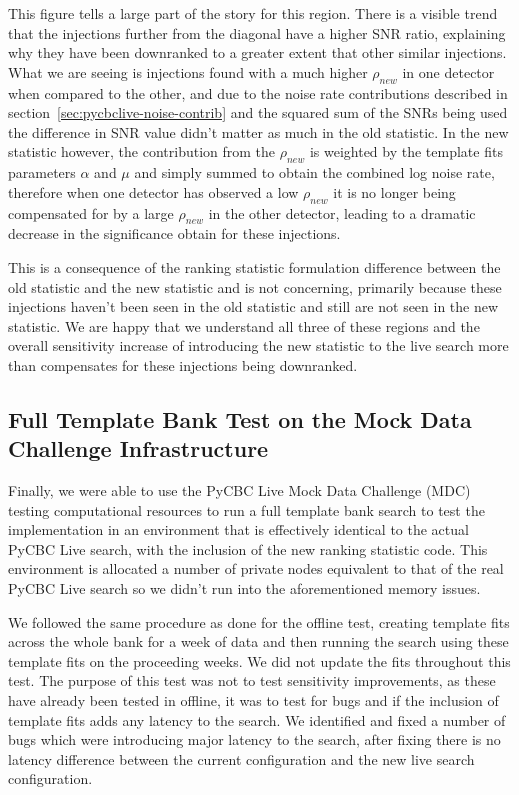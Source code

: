 %
This figure tells a large part of the story for this region. There is a visible trend that the injections further from the diagonal have a higher SNR ratio, explaining why they have been downranked to a greater extent that other similar injections. What we are seeing is injections found with a much higher $\rho_{new}$ in one detector when compared to the other, and due to the noise rate contributions described in section~\ref{sec:pycbclive-noise-contrib} and the squared sum of the SNRs being used the difference in SNR value didn't matter as much in the old statistic. In the new statistic however, the contribution from the $\rho_{new}$ is weighted by the template fits parameters $\alpha$ and $\mu$ and simply summed to obtain the combined log noise rate, therefore when one detector has observed a low $\rho_{new}$ it is no longer being compensated for by a large $\rho_{new}$ in the other detector, leading to a dramatic decrease in the significance obtain for these injections.

This is a consequence of the ranking statistic formulation difference between the old statistic and the new statistic and is not concerning, primarily because these injections haven't been seen in the old statistic and still are not seen in the new statistic. We are happy that we understand all three of these regions and the overall sensitivity increase of introducing the new statistic to the live search more than compensates for these injections being downranked.

\subsection{\label{sec:pycbclive-mdc-test}Full Template Bank Test on the Mock Data Challenge Infrastructure}

Finally, we were able to use the PyCBC Live Mock Data Challenge (MDC) testing computational resources to run a full template bank search to test the implementation in an environment that is effectively identical to the actual PyCBC Live search, with the inclusion of the new ranking statistic code. This environment is allocated a number of private nodes equivalent to that of the real PyCBC Live search so we didn't run into the aforementioned memory issues.

We followed the same procedure as done for the offline test, creating template fits across the whole bank for a week of data and then running the search using these template fits on the proceeding weeks. We did not update the fits throughout this test. The purpose of this test was not to test sensitivity improvements, as these have already been tested in offline, it was to test for bugs and if the inclusion of template fits adds any latency to the search. We identified and fixed a number of bugs which were introducing major latency to the search, after fixing there is no latency difference between the current configuration and the new live search configuration.